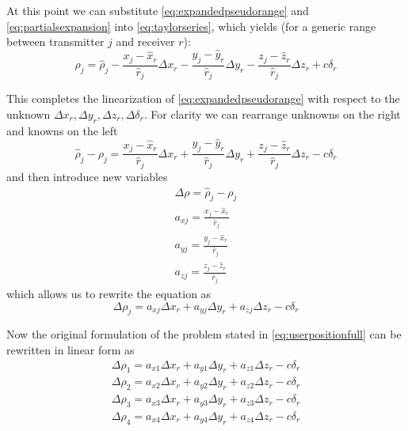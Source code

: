 At this point we can substitute \ref{eq:expandedpseudorange} and
\ref{eq:partialsexpansion} into \ref{eq:taylorseries}, which yields (for a
generic range between transmitter $j$ and receiver $r$):
\begin{equation}
  \rho_j = \hat \rho_j - \frac{x_j - \hat x_r}{\hat r_j}\Delta x_r - \frac{y_j -
    \hat y_r}{\hat r_j}\Delta y_r - \frac{z_j - \hat z_r}{\hat r_j}\Delta z_r +
    c\delta_r
\end{equation}

This completes the linearization of \ref{eq:expandedpseudorange} with respect to
the unknown $\Delta x_r, \Delta y_r, \Delta z_r, \Delta \delta_r$. For clarity
we can rearrange unknowns on the right and knowns on the left
\begin{equation}
  \hat \rho_j - \rho_j = \frac{x_j - \hat x_r}{\hat r_j}\Delta x_r + \frac{y_j -
    \hat y_r}{\hat r_j}\Delta y_r + \frac{z_j - \hat z_r}{\hat r_j}\Delta z_r -
    c\delta_r
\end{equation}
and then introduce new variables
\begin{equation}
  \begin{array}{l}
    \Delta \rho = \hat \rho_j - \rho_j \\
    a_{xj} = \frac{x_j - \hat x_r}{\hat r_j} \\
    a_{yj} = \frac{y_j - \hat x_r}{\hat r_j} \\
    a_{zj} = \frac{z_j - \hat z_r}{\hat r_j}
  \end{array}
\end{equation}
which allows us to rewrite the equation as
\begin{equation}
  \Delta \rho_j = a_{xj} \Delta x_r + a_{yj} \Delta y_r + a_{zj} \Delta z_r - c \delta_r
\end{equation}

Now the original formulation of the problem stated in \ref{eq:userpositionfull}
can be rewritten in linear form as
\begin{equation}
  \begin{array}{l}
    \Delta \rho_1 = a_{x1} \Delta x_r + a_{y1} \Delta y_r + a_{z1} \Delta z_r - c \delta_r \\
    \Delta \rho_2 = a_{x2} \Delta x_r + a_{y2} \Delta y_r + a_{z2} \Delta z_r - c \delta_r \\
    \Delta \rho_3 = a_{x3} \Delta x_r + a_{y3} \Delta y_r + a_{z3} \Delta z_r - c \delta_r \\
    \Delta \rho_4 = a_{x4} \Delta x_r + a_{y4} \Delta y_r + a_{z4} \Delta z_r - c \delta_r
  \end{array}
\end{equation}

